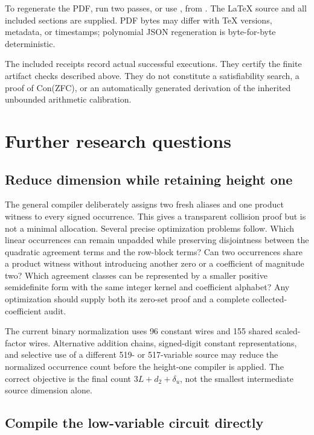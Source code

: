 To regenerate the PDF, run two passes, or use , from
. The LaTeX source and all included sections are supplied.
PDF bytes may differ with TeX versions, metadata, or timestamps;
polynomial JSON regeneration is byte-for-byte deterministic.

The included receipts record actual successful executions. They certify
the finite artifact checks described above. They do not constitute a
satisfiability search, a proof of Con(ZFC), or an automatically generated
derivation of the inherited unbounded arithmetic calibration.

\section{Further research questions}\label{sec:further}

\subsection{Reduce dimension while retaining height one}

The general compiler deliberately assigns two fresh aliases and one
product witness to every signed occurrence. This gives a transparent
collision proof but is not a minimal allocation. Several precise
optimization problems follow. Which linear occurrences can remain
unpadded while preserving disjointness between the quadratic agreement
terms and the row-block terms? Can two occurrences share a product
witness without introducing another zero or a coefficient of magnitude
two? Which agreement classes can be represented by a smaller positive
semidefinite form with the same integer kernel and coefficient alphabet?
Any optimization should supply both its zero-set proof and a complete
collected-coefficient audit.

The current binary normalization uses 96 constant wires and 155 shared
scaled-factor wires. Alternative addition chains, signed-digit constant
representations, and selective use of a different 519- or 517-variable
source may reduce the normalized occurrence count before the height-one
compiler is applied. The correct objective is the final count
$3L+d_2+\delta_u$, not the smallest intermediate source dimension alone.

\subsection{Compile the low-variable circuit directly}

